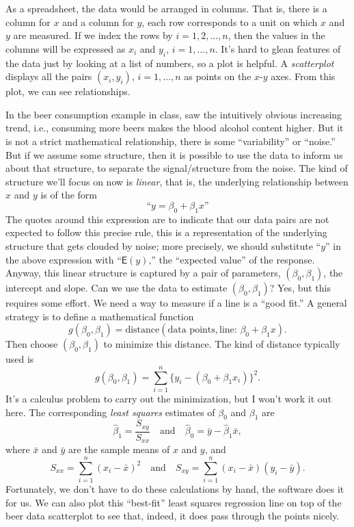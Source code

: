 \documentclass[a4paper, 12pt]{article}
\theoremstyle{plain}
\theoremstyle{definition}
\theoremstyle{remark}
\newcommand{\E}{\mathsf{E}}
\begin{document}
As a spreadsheet, the data would be arranged in columns.  That is, there is a column for $x$ and a column for $y$, each row corresponds to a unit on which $x$ and $y$ are measured.  If we index the rows by $i=1,2,\ldots,n$, then the values in the columns will be expressed as $x_i$ and $y_i$, $i=1,\ldots,n$.  It's hard to glean features of the data just by looking at a list of numbers, so a plot is helpful.  A {\em scatterplot} displays all the pairs $(x_i, y_i)$, $i=1,\ldots,n$ as points on the $x$-$y$ axes.  From this plot, we can see relationships.  

In the beer consumption example in class, saw the intuitively obvious increasing trend, i.e., consuming more beers makes the blood alcohol content higher.  But it is not a strict mathematical relationship, there is some ``variability'' or ``noise.''  But if we assume some structure, then it is possible to use the data to inform us about that structure, to separate the signal/structure from the noise.  The kind of structure we'll focus on now is {\em linear}, that is, the underlying relationship between $x$ and $y$ is of the form 
\[ \text{``$y = \beta_0 + \beta_1 x$''} \]
The quotes around this expression are to indicate that our data pairs are not expected to follow this precise rule, this is a representation of the underlying structure that gets clouded by noise; more precisely, we should substitute ``$y$'' in the above expression with ``$\E(y)$,'' the ``expected value'' of the response.  Anyway, this linear structure is captured by a pair of parameters, $(\beta_0, \beta_1)$, the intercept and slope.  Can we use the data to estimate $(\beta_0, \beta_1)$?  Yes, but this requires some effort.  We need a way to measure if a line is a ``good fit.''  A general strategy is to define a mathematical function 
\[ g(\beta_0, \beta_1) = \text{distance}(\text{data points}, \text{line: $\beta_0 + \beta_1 x$}). \]
Then choose $(\beta_0, \beta_1)$ to minimize this distance.  The kind of distance typically used is 
\[ g(\beta_0, \beta_1) = \sum_{i=1}^n \{ y_i - (\beta_0 + \beta_1 x_i)\}^2. \]
It's a calculus problem to carry out the minimization, but I won't work it out here.  The corresponding {\em least squares} estimates of $\beta_0$ and $\beta_1$ are 
\[ \hat\beta_1 = \frac{S_{xy}}{S_{xx}} \quad \text{and} \quad \hat\beta_0 = \bar y - \hat\beta_1 \bar x, \]
where $\bar x$ and $\bar y$ are the sample means of $x$ and $y$, and 
\[ S_{xx} = \sum_{i=1}^n (x_i - \bar x)^2 \quad \text{and} \quad S_{xy} = \sum_{i=1}^n (x_i - \bar x) (y_i - \bar y). \]
Fortunately, we don't have to do these calculations by hand, the software does it for us.  We can also plot this ``best-fit'' least squares regression line on top of the beer data scatterplot to see that, indeed, it does pass through the points nicely.  
\end{document}
